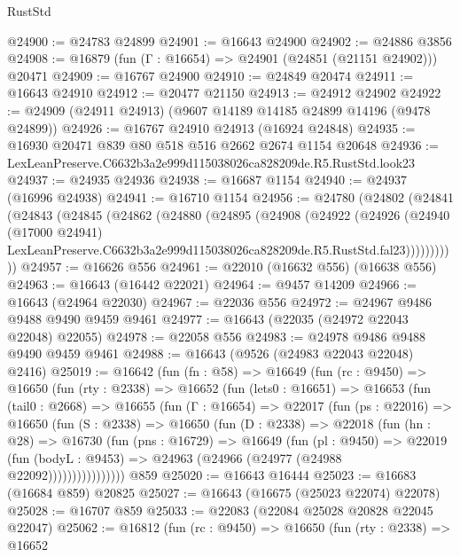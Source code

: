 \begin{lexlean}{RustStd}
\begin{coremodule}
@24900 := @24783 @24899
@24901 := @16643 @24900
@24902 := @24886 @3856
@24908 := @16879 (fun (Γ : @16654) => @24901 (@24851 (@21151 @24902))) @20471
@24909 := @16767 @24900
@24910 := @24849 @20474
@24911 := @16643 @24910
@24912 := @20477 @21150
@24913 := @24912 @24902
@24922 := @24909 (@24911 @24913) (@9607 @14189 @14185 @24899 @14196 (@9478 @24899))
@24926 := @16767 @24910 @24913 (@16924 @24848)
@24935 := @16930 @20471 @839 @80 @518 @516 @2662 @2674 @1154 @20648
@24936 := LexLeanPreserve.C6632b3a2e999d115038026ca828209de.R5.RustStd.look23
@24937 := @24935 @24936
@24938 := @16687 @1154
@24940 := @24937 (@16996 @24938)
@24941 := @16710 @1154
@24956 := @24780
    (@24802
      (@24841
        (@24843
          (@24845
            (@24862
              (@24880
                (@24895
                  (@24908
                    (@24922
                      (@24926
                        (@24940
                          (@17000 @24941)
                          LexLeanPreserve.C6632b3a2e999d115038026ca828209de.R5.RustStd.fal23)))))))))))
@24957 := @16626 @556
@24961 := @22010 (@16632 @556) (@16638 @556)
@24963 := @16643 (@16442 @22021)
@24964 := @9457 @14209
@24966 := @16643 (@24964 @22030)
@24967 := @22036 @556
@24972 := @24967 @9486 @9488 @9490 @9459 @9461
@24977 := @16643 (@22035 (@24972 @22043 @22048) @22055)
@24978 := @22058 @556
@24983 := @24978 @9486 @9488 @9490 @9459 @9461
@24988 := @16643 (@9526 (@24983 @22043 @22048) @2416)
@25019 := @16642
    (fun (fn : @58) =>
    @16649
      (fun (rc : @9450) =>
      @16650
        (fun (rty : @2338) =>
        @16652
          (fun (lets0 : @16651) =>
          @16653
            (fun (tail0 : @2668) =>
            @16655
              (fun (Γ : @16654) =>
              @22017
                (fun (ps : @22016) =>
                @16650
                  (fun (S : @2338) =>
                  @16650
                    (fun (D : @2338) =>
                    @22018
                      (fun (hn : @28) =>
                      @16730
                        (fun (pns : @16729) =>
                        @16649
                          (fun (pl : @9450) =>
                          @22019
                            (fun (bodyL : @9453) =>
                            @24963 (@24966 (@24977 (@24988 @22092))))))))))))))))
    @859
@25020 := @16643 @16444
@25023 := @16683 (@16684 @859) @20825
@25027 := @16643 (@16675 (@25023 @22074) @22078)
@25028 := @16707 @859
@25033 := @22083 (@22084 @25028 @20828 @22045 @22047)
@25062 := @16812
    (fun (rc : @9450) =>
    @16650
      (fun (rty : @2338) =>
      @16652

\end{coremodule}
\end{lexlean}
